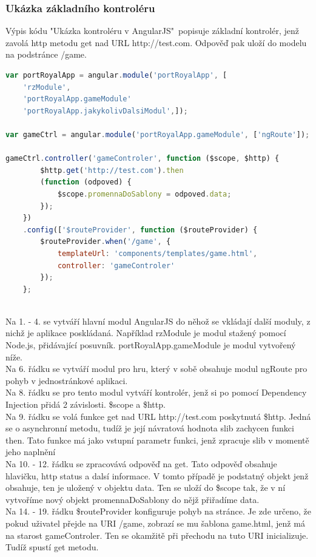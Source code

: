 \documentclass[czech,master,public,dept460,male,cpdeclaration,twoside]{diploma}
\begin{document}
\subsubsection{Ukázka základního kontroléru}
Výpis kódu "Ukázka kontroléru v AngularJS"~popisuje základní kontrolér, jenž zavolá http metodu get nad URL http://test.com. Odpověď pak uloží do modelu na podstránce /game.
\\
\begin{lstlisting}[language=JavaScript, caption=Ukázka kontroléru v AngularJS]
var portRoyalApp = angular.module('portRoyalApp', [
    'rzModule',
    'portRoyalApp.gameModule'
    'portRoyalApp.jakykolivDalsiModul',]);

var gameCtrl = angular.module('portRoyalApp.gameModule', ['ngRoute']);

gameCtrl.controller('gameControler', function ($scope, $http) {
        $http.get('http://test.com').then
        (function (odpoved) {
            $scope.promennaDoSablony = odpoved.data;
        });
    })
    .config(['$routeProvider', function ($routeProvider) {
        $routeProvider.when('/game', {
            templateUrl: 'components/templates/game.html',
            controller: 'gameControler'
        });
    };
\end{lstlisting}
~\\
Na 1. - 4. se vytváří hlavní modul AngularJS do něhož se vkládají další moduly, z nichž je aplikace poskládaná. Například rzModule je modul stažený pomocí Node.js, přidávající posuvník. portRoyalApp.gameModule je modul vytvořený níže.\\
Na 6. řádku se vytváří modul pro hru, který v sobě obsahuje modul ngRoute pro pohyb v jednostránkové aplikaci.\\
Na 8. řádku se pro tento modul vytváří kontrolér, jenž si po pomocí Dependency Injection přidá 2 závislosti. \$scope a \$http.\\
Na 9. řádku se volá funkce get nad URL http://test.com poskytnutá \$http. Jedná se o asynchronní metodu, tudíž je její návratová hodnota slib zachycen funkci then. Tato funkce má jako vstupní parametr funkci, jenž zpracuje slib v momentě jeho naplnění\\
Na 10. - 12. řádku se zpracovává odpověď na get. Tato odpověď obsahuje hlavičku, http status a dalsí informace. V tomto případě je podstatný objekt jenž obsahuje, ten je uložený v objektu data. Ten se uloží do \$scope tak, že v ní vytvoříme nový objekt promennaDoSablony do nějž přiřadíme data.\\
Na 14. - 19.  řádku \$routeProvider konfiguruje pohyb na stránce. Je zde určeno, že pokud uživatel přejde na URI /game, zobrazí se mu šablona game.html, jenž má na starost gameControler. Ten se okamžitě při přechodu na tuto URI inicializuje. Tudíž spustí get metodu.
\end{document}
